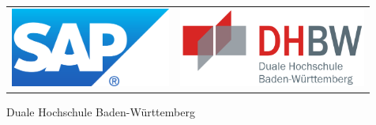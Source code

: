 
\begin{titlepage}
	\begin{longtable}{p{} p{}}
	  {\includegraphics[height=2.6cm]{images/logo.png}} & 
	  {\includegraphics[height=2.6cm]{images/dhbw.png}}
	\end{longtable}
	\enlargethispage{20mm}
	\begin{center}
	 \vspace*{0mm} Duale Hochschule Baden-Württemberg \\ \dhbw\\
	 	\vspace*{10mm}	{\large\bf \arbeit}\\
	 	  \vspace*{12mm}	{\LARGE\bf \titel }\\
	 	  
	 	  \vspace*{12mm}	\studiengang\\
	 	  

\end{center}
\end{titlepage}
